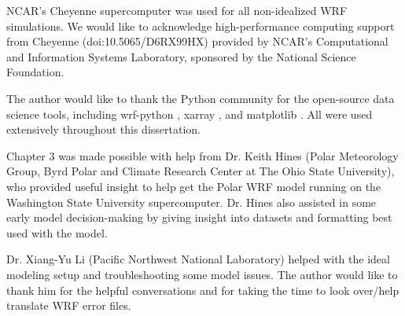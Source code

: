 NCAR's Cheyenne supercomputer was used for all non-idealized WRF simulations. We would like to acknowledge high-performance computing support from Cheyenne (doi:10.5065/D6RX99HX) provided by NCAR's Computational and Information Systems Laboratory, sponsored by the National Science Foundation.



The author would like to thank the Python community for the open-source data science tools, including wrf-python \citep{wrfpython}, xarray \citep{xarray}, and matplotlib \citep{matplotlib}. All were used extensively throughout this dissertation. 

Chapter 3 was made possible with help from Dr. Keith Hines (Polar Meteorology Group, Byrd Polar and Climate Research Center at The Ohio State University), who provided useful insight to help get the Polar WRF model running on the Washington State University supercomputer. Dr. Hines also assisted in some early model decision-making by giving insight into datasets and formatting best used with the model.

Dr. Xiang-Yu Li (Pacific Northwest National Laboratory) helped with the ideal modeling setup and troubleshooting some model issues. The author would like to thank him for the helpful conversations and for taking the time to look over/help translate WRF error files.